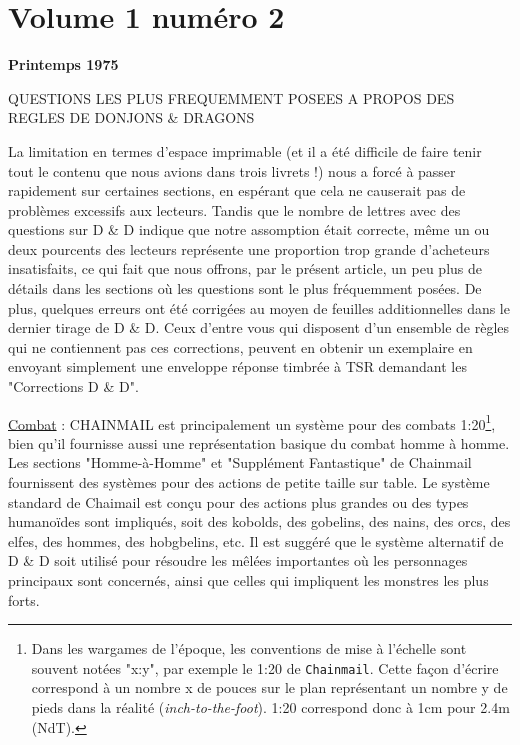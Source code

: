 \newpage
{}\section*{Volume 1 numéro 2}
\label{sr12}

\bigskip

\begin{center}
{\LARGE \textbf{Printemps 1975}}
\end{center}

\bigskip\bigskip

\begin{center}
QUESTIONS LES PLUS FREQUEMMENT POSEES A PROPOS DES REGLES DE DONJONS \& DRAGONS
\end{center}

La limitation en termes d'espace imprimable (et il a été difficile de faire tenir tout le contenu que nous avions dans trois livrets !) nous a forcé à passer rapidement sur certaines sections, en espérant que cela ne causerait pas de problèmes excessifs aux lecteurs. Tandis que le nombre de lettres avec des questions sur D \& D indique que notre assomption était correcte, même un ou deux pourcents des lecteurs représente une proportion trop grande d'acheteurs insatisfaits, ce qui fait que nous offrons, par le présent article, un peu plus de détails dans les sections où les questions sont le plus fréquemment posées. De plus, quelques erreurs ont été corrigées au moyen de feuilles additionnelles dans le dernier tirage de D \& D. Ceux d'entre vous qui disposent d'un ensemble de règles qui ne contiennent pas ces corrections, peuvent en obtenir un exemplaire en envoyant simplement une enveloppe réponse timbrée à TSR demandant les "Corrections D \& D".

\medskip

\uline{Combat} : CHAINMAIL est principalement un système pour des combats 1:20\footnote{
    Dans les wargames de l'époque, les conventions de mise à l'échelle sont souvent notées "x:y", par exemple le 1:20 de \texttt{Chainmail}. Cette façon d'écrire correspond à un nombre x de pouces sur le plan représentant un nombre y de pieds dans la réalité (\textit{inch-to-the-foot}). 1:20 correspond donc à 1cm pour 2.4m (NdT).
}, bien qu'il fournisse aussi une représentation basique du combat homme à homme. Les sections "Homme-à-Homme" et "Supplément Fantastique" de Chainmail fournissent des systèmes pour des actions de petite taille sur table. Le système standard de Chaimail est conçu pour des actions plus grandes ou des types humanoïdes sont impliqués, soit des kobolds, des gobelins, des nains, des orcs, des elfes, des hommes, des hobgbelins, etc. Il est suggéré que le système alternatif de D \& D soit utilisé pour résoudre les mêlées importantes où les personnages principaux sont concernés, ainsi que celles qui impliquent les monstres les plus forts.

